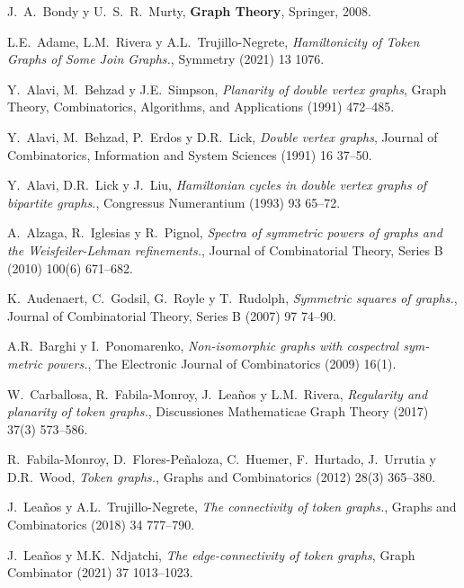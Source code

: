 \begin{thebibliography}{99}

  J.~A.~Bondy y U.~S.~R.~Murty,
  \textbf{Graph Theory},
  Springer, 2008.

  L.E.~Adame, L.M.~Rivera y A.L.~Trujillo-Negrete,
  \textit{Hamiltonicity of Token Graphs of Some Join Graphs.},
  Symmetry (2021) 13 1076. 

  Y.~Alavi, M.~Behzad y J.E.~Simpson,
  \textit{Planarity of double vertex graphs},
  Graph Theory, Combinatorics, Algorithms, and Applications (1991) 472--485.

 Y.~Alavi, M.~Behzad, P.~Erdos y D.R.~Lick,
 \textit{Double vertex graphs},
 Journal of Combinatorics, Information and System Sciences (1991) 16 37--50.

 Y.~Alavi, D.R.~Lick y J.~Liu,
 \textit{Hamiltonian cycles in double vertex graphs of bipartite graphs.},
 Congressus Numerantium (1993) 93 65--72.

  A.~Alzaga, R.~Iglesias y  R.~Pignol,
  \textit{Spectra of symmetric powers of graphs and
  the Weisfeiler-Lehman refinements.},
  Journal of Combinatorial Theory, Series B (2010) 100(6) 671--682. 

  K.~Audenaert, C.~Godsil, G.~Royle y T.~Rudolph,
  \textit{Symmetric squares of graphs.},
  Journal of Combinatorial Theory, Series B (2007) 97 74--90. 

  A.R.~Barghi y I.~Ponomarenko,
  \textit{Non-isomorphic graphs with cospectral sym-
  metric powers.},
  The Electronic Journal of Combinatorics (2009) 16(1).

  W.~Carballosa, R.~Fabila-Monroy, J.~Lea\~{n}os y L.M.~Rivera,
  \textit{Regularity and
  planarity of token graphs.},
  Discussiones Mathematicae Graph Theory (2017) 37(3) 573--586. 

  R.~Fabila-Monroy, D.~Flores-Pe\~{n}aloza, C.~Huemer, F.~Hurtado, J.~Urrutia y
D.R.~Wood,
  \textit{Token graphs.},
  Graphs and Combinatorics (2012) 28(3) 365--380. 

  J.~Lea\~{n}os y A.L.~Trujillo-Negrete,
  \textit{The connectivity of token graphs.},
  Graphs and Combinatorics (2018) 34 777--790. 

  J.~Lea\~{n}os y M.K.~Ndjatchi,
  \textit{The edge-connectivity of token graphs},
  Graph Combinator (2021) 37 1013--1023. 
 

\end{thebibliography}
